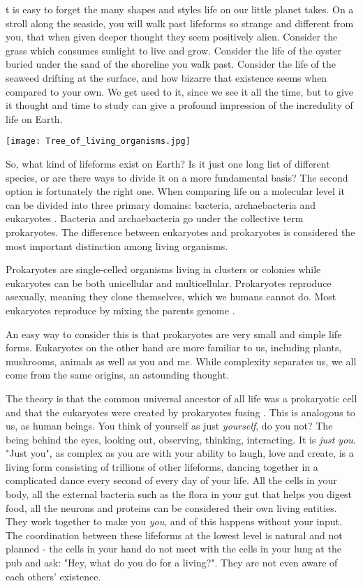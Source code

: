 t is easy to forget the many shapes and styles life on our little planet takes.
On a stroll along the seaside, you will walk past lifeforms so strange and different from you, that when given deeper thought they seem positively alien.
Consider the grass which consumes sunlight to live and grow.
Consider the life of the oyster buried under the sand of the shoreline you walk past.
Consider the life of the seaweed drifting at the surface, and how bizarre that existence seems when compared to your own.
We get used to it, since we see it all the time, but to give it thought and time to study can give a profound impression of the incredulity of life on Earth.

\begin{center}
	\texttt{[image: Tree\_of\_living\_organisms.jpg]}
\end{center}

So, what kind of lifeforms exist on Earth?
Is it just one long list of different species, or are there ways to divide it on a more fundamental basis?
The second option is fortunately the right one.
When comparing life on a molecular level it can be divided into three primary domains: bacteria, archaebacteria and eukaryotes \cite{Eukaryotes}.
Bacteria and archaebacteria go under the collective term prokaryotes.
The difference between eukaryotes and prokaryotes is considered the most important distinction among living organisms.

Prokaryotes are single-celled organisms living in clusters or colonies while eukaryotes can be both unicellular and multicellular.
Prokaryotes reproduce asexually, meaning they clone themselves, which we humans cannot do.
Most eukaryotes reproduce by mixing the parents genome \cite{ProcaEuka}. 

An easy way to consider this is that prokaryotes are very small and simple life forms.
Eukaryotes on the other hand are more familiar to us, including plants, mushrooms, animals as well as you and me.
While complexity separates us, we all come from the same origins, an astounding thought.

The theory is that the common universal ancestor of all life was a prokaryotic cell and that the eukaryotes were created by prokaryotes fusing \cite{ProcaEuka}.
This is analogous to us, as human beings.
You think of yourself as just \textit {yourself}, do you not?
The being behind the eyes, looking out, observing, thinking, interacting.
It is \textit{just you}.
"Just you", as complex as you are with your ability to laugh, love and create, is a living form consisting of trillions of other lifeforms, dancing together in a complicated dance every second of every day of your life.
All the cells in your body, all the external bacteria such as the flora in your gut that helps you digest food, all the neurons and proteins can be considered their own living entities.
They work together to make you \textit{you}, and of this happens without your input.
The coordination between these lifeforms at the lowest level is natural and not planned - the cells in your hand do not meet with the cells in your lung at the pub and ask: "Hey, what do you do for a living?".
They are not even aware of each others' existence.

